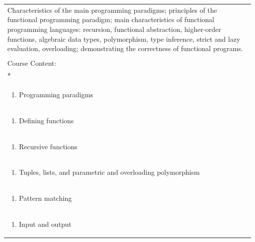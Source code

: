 \documentclass[11pt]{article}
\begin{document}
\begin{center}
\begin{longtable}{|p{4cm}|p{4cm}|p{4cm}|p{4cm}|}
\multicolumn{4}{|p{\dimexpr 16cm + 6\tabcolsep\relax}|}{Characteristics of the main programming paradigms; principles of the functional programming paradigm; main characteristics of functional programming languages: recursion, functional abstraction, higher-order functions, algebraic data types, polymorphism, type inference, strict and lazy evaluation, overloading; demonstrating the correctness of functional programs.}\\
\multicolumn{4}{|p{16cm}|}{}\\
\hline
\multicolumn{4}{|p{16cm}|}{Course Content:}\\*
\multicolumn{4}{|p{\dimexpr 16cm + 6\tabcolsep\relax}|}{\begin{enumerate}[start=1]\item Introduction\end{enumerate}}\\
\multicolumn{4}{|p{\dimexpr 16cm + 6\tabcolsep\relax}|}{\begin{enumerate}[start=2]\item Programming paradigms\end{enumerate}}\\
\multicolumn{4}{|p{\dimexpr 16cm + 6\tabcolsep\relax}|}{\begin{enumerate}[start=3]\item Defining functions\end{enumerate}}\\
\multicolumn{4}{|p{\dimexpr 16cm + 6\tabcolsep\relax}|}{\begin{enumerate}[start=4]\item Recursive functions\end{enumerate}}\\
\multicolumn{4}{|p{\dimexpr 16cm + 6\tabcolsep\relax}|}{\begin{enumerate}[start=5]\item Tuples, lists, and parametric and overloading polymorphism\end{enumerate}}\\
\multicolumn{4}{|p{\dimexpr 16cm + 6\tabcolsep\relax}|}{\begin{enumerate}[start=6]\item Pattern matching\end{enumerate}}\\
\multicolumn{4}{|p{\dimexpr 16cm + 6\tabcolsep\relax}|}{\begin{enumerate}[start=7]\item Input and output\end{enumerate}}\\

\end{longtable}
\end{center}
\end{document}
